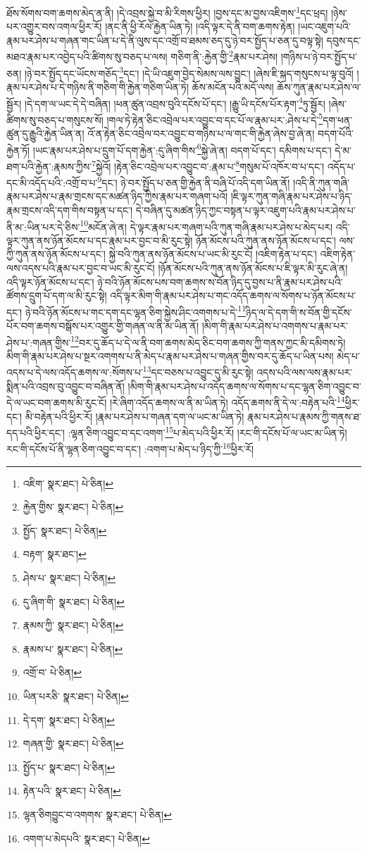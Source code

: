 ཐོས་སོགས་བག་ཆགས་མེད་ན་ནི། །དེ་འབྲས་སྐྱེ་བ་མི་རིགས་ཕྱིར། །བྱས་དང་མ་བྱས་འཇིགས་\footnote{འཇིག་  སྣར་ཐང་།  པེ་ཅིན། }དང་ཕྲད། །ཉེས་པར་འགྱུར་བས་འགལ་ཕྱིར་རོ། །ནང་ནི་ཕྱི་རོལ་རྐྱེན་ཡིན་ཏེ། །འདི་ལྟར་དེ་ནི་བག་ཆགས་རྟེན། །ཡང་འཇུག་པའི་རྣམ་པར་ཤེས་པ་གཞན་གང་ཡིན་པ་དེ་ནི་ལུས་དང་འགྲོ་བ་ཐམས་ཅད་དུ་ཉེ་བར་སྤྱོད་པ་ཅན་དུ་བལྟ་སྟེ། དབུས་དང་མཐའ་རྣམ་པར་འབྱེད་པའི་ཚིགས་སུ་བཅད་པ་ལས། གཅིག་ནི་:རྐྱེན་གྱི་\footnote{རྐྱེན་གྱིས་  སྣར་ཐང་།  པེ་ཅིན། }རྣམ་པར་ཤེས། །གཉིས་པ་ཉེ་བར་སྤྱོད་པ་ཅན། །ཉེ་བར་སྤྱོད་དང་ཡོངས་གཅོད་\footnote{སྤྱོད་  སྣར་ཐང་།  པེ་ཅིན། }དང་། །དེ་ཡི་འཇུག་བྱེད་སེམས་ལས་བྱུང་། །ཞེས་ཇི་སྐད་གསུངས་པ་ལྟ་བུའོ། །རྣམ་པར་ཤེས་པ་དེ་གཉིས་ནི་གཅིག་གི་རྐྱེན་གཅིག་ཡིན་ཏེ། ཆོས་མངོན་པའི་མདོ་ལས། ཆོས་ཀུན་རྣམ་པར་ཤེས་ལ་སྦྱོར། །དེ་དག་ལ་ཡང་དེ་དེ་བཞིན། །ཕན་ཚུན་འབྲས་བུའི་དངོས་པོ་དང་། །རྒྱུ་ཡི་དངོས་པོར་རྟག་\footnote{བརྟག་  སྣར་ཐང་། }ཏུ་སྦྱོར། །ཞེས་ཚིགས་སུ་བཅད་པ་གསུངས་སོ། །གལ་ཏེ་རྟེན་ཅིང་འབྲེལ་པར་འབྱུང་བ་དང་པོ་ལ་རྣམ་པར་:ཤེས་པ་དེ་\footnote{ཤེས་པ་  སྣར་ཐང་།  པེ་ཅིན། }དག་ཕན་ཚུན་དུ་རྒྱུའི་རྐྱེན་ཡིན་ན། འོ་ན་རྟེན་ཅིང་འབྲེལ་བར་འབྱུང་བ་གཉིས་པ་ལ་གང་གི་རྐྱེན་ཞེས་བྱ་ཞེ་ན། བདག་པོའི་རྐྱེན་ཏོ། །ཡང་རྣམ་པར་ཤེས་པ་དྲུག་པོ་དག་རྐྱེན་:དུ་ཞིག་གིས་\footnote{དུ་ཞིག་གི་  སྣར་ཐང་།  པེ་ཅིན། }སྐྱེ་ཞེ་ན། བདག་པོ་དང་། དམིགས་པ་དང་། དེ་མ་ཐག་པའི་རྐྱེན་:རྣམས་ཀྱིས་\footnote{རྣམས་ཀྱི་  སྣར་ཐང་།  པེ་ཅིན། }སྐྱེའོ། །རྟེན་ཅིང་འབྲེལ་པར་འབྱུང་བ་:རྣམ་པ་\footnote{རྣམས་པ་  སྣར་ཐང་།  པེ་ཅིན། }གསུམ་པོ་འཁོར་བ་པ་དང་། འདོད་པ་དང་མི་འདོད་པའི་:འགྲོ་བ་པ་\footnote{འགྲོ་བ་  པེ་ཅིན། }དང་། ཉེ་བར་སྤྱོད་པ་ཅན་གྱི་རྐྱེན་ནི་བཞི་པོ་འདི་དག་ཡིན་ནོ། །འདི་ནི་ཀུན་གཞི་རྣམ་པར་ཤེས་པ་རྣམ་གྲངས་དང་མཚན་ཉིད་ཀྱིས་རྣམ་པར་གཞག་པའོ། །ཇི་ལྟར་ཀུན་གཞི་རྣམ་པར་ཤེས་པ་ཉིད་རྣམ་གྲངས་འདི་དག་གིས་བསྟན་པ་དང་། དེ་བཞིན་དུ་མཚན་ཉིད་ཀྱང་བསྟན་པ་ལྟར་འཇུག་པའི་རྣམ་པར་ཤེས་པ་ནི་མ་:ཡིན་པར་དེ་ཅིས་\footnote{ཡིན་པརཅི་  སྣར་ཐང་།  པེ་ཅིན། }མངོན་ཞེ་ན། དེ་ལྟར་རྣམ་པར་གཞག་པའི་ཀུན་གཞི་རྣམ་པར་ཤེས་པ་མེད་པར། འདི་ལྟར་ཀུན་ནས་ཉོན་མོངས་པ་དང་རྣམ་པར་བྱང་བ་མི་རུང་སྟེ། ཉོན་མོངས་པའི་ཀུན་ནས་ཉོན་མོངས་པ་དང་། ལས་ཀྱི་ཀུན་ནས་ཉོན་མོངས་པ་དང་། སྐྱེ་བའི་ཀུན་ནས་ཉོན་མོངས་པ་ཡང་མི་རུང་ངོ། །འཇིག་རྟེན་པ་དང་། འཇིག་རྟེན་ལས་འདས་པའི་རྣམ་པར་བྱང་བ་ཡང་མི་རུང་ངོ། །ཉོན་མོངས་པའི་ཀུན་ནས་ཉོན་མོངས་པ་ཇི་ལྟར་མི་རུང་ཞེ་ན། འདི་ལྟར་ཉོན་མོངས་པ་དང་། ཉེ་བའི་ཉོན་མོངས་པས་བག་ཆགས་ས་བོན་ཉིད་དུ་བྱས་པ་ནི་རྣམ་པར་ཤེས་པའི་ཚོགས་དྲུག་པོ་དག་ལ་མི་རུང་སྟེ། འདི་ལྟར་མིག་གི་རྣམ་པར་ཤེས་པ་གང་འདོད་ཆགས་ལ་སོགས་པ་ཉོན་མོངས་པ་དང་། ཉེ་བའི་ཉོན་མོངས་པ་གང་དག་དང་ལྷན་ཅིག་སྐྱེས་ཤིང་འགགས་པ་དེ་\footnote{དེ་དག་  སྣར་ཐང་།  པེ་ཅིན། }ཉིད་ལ་དེ་དག་གི་ས་བོན་གྱི་དངོས་པོར་བག་ཆགས་བསྒོས་པར་འགྱུར་གྱི་གཞན་ལ་ནི་མ་ཡིན་ནོ། །མིག་གི་རྣམ་པར་ཤེས་པ་འགགས་པ་རྣམ་པར་ཤེས་པ་:གཞན་གྱིས་\footnote{གཞན་གྱི་  སྣར་ཐང་།  པེ་ཅིན། }བར་དུ་ཆོད་པ་དེ་ལ་ནི་བག་ཆགས་མེད་ཅིང་བག་ཆགས་ཀྱི་གནས་ཀྱང་མི་དམིགས་ཏེ། མིག་གི་རྣམ་པར་ཤེས་པ་སྔར་འགགས་པ་ནི་མེད་པ་རྣམ་པར་ཤེས་པ་གཞན་གྱིས་བར་དུ་ཆོད་པ་ཡིན་པས། མེད་པ་འདས་པ་དེ་ལས་འདོད་ཆགས་ལ་:སོགས་པ་\footnote{སྤྱོད་པ་  སྣར་ཐང་།  པེ་ཅིན། }དང་བཅས་པ་འབྱུང་དུ་མི་རུང་སྟེ། འདས་པའི་ལས་ལས་རྣམ་པར་སྨིན་པའི་འབྲས་བུ་འབྱུང་བ་བཞིན་ནོ། །མིག་གི་རྣམ་པར་ཤེས་པ་འདོད་ཆགས་ལ་སོགས་པ་དང་ལྷན་ཅིག་འབྱུང་བ་དེ་ལ་ཡང་བག་ཆགས་མི་རུང་ངོ། །རེ་ཞིག་འདོད་ཆགས་ལ་ནི་མ་ཡིན་ཏེ། འདོད་ཆགས་ནི་དེ་ལ་:བརྟེན་པའི་\footnote{རྟེན་པའི་  སྣར་ཐང་།  པེ་ཅིན། }ཕྱིར་དང་། མི་བརྟེན་པའི་ཕྱིར་རོ། །རྣམ་པར་ཤེས་པ་གཞན་དག་ལ་ཡང་མ་ཡིན་ཏེ། རྣམ་པར་ཤེས་པ་རྣམས་ཀྱི་གནས་ཐ་དད་པའི་ཕྱིར་དང་། :ལྷན་ཅིག་འབྱུང་བ་དང་འགག་\footnote{ལྷན་ཅིགབྱུང་བ་འགགས་  སྣར་ཐང་།  པེ་ཅིན། }པ་མེད་པའི་ཕྱིར་རོ། །རང་གི་དངོས་པོ་ལ་ཡང་མ་ཡིན་ཏེ། རང་གི་དངོས་པོ་ནི་ལྷན་ཅིག་འབྱུང་བ་དང་། :འགག་པ་མེད་པ་ཉིད་ཀྱི་\footnote{འགག་པ་མེདཔའི་  སྣར་ཐང་།  པེ་ཅིན། }ཕྱིར་རོ། 